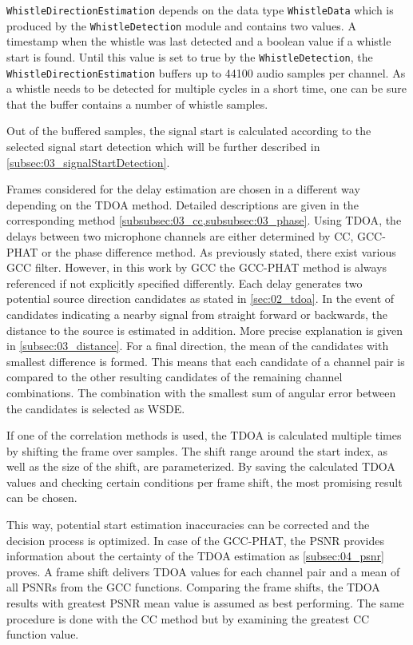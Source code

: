 \lstinline!WhistleDirectionEstimation! depends on the data type \lstinline!WhistleData!
which is produced by the \lstinline!WhistleDetection! module and contains two values.
A timestamp when the whistle was last detected
and a boolean value if a whistle start is found.
Until this value is set to true by the \lstinline!WhistleDetection!, the
\lstinline!WhistleDirectionEstimation! buffers up to
44100 audio samples per channel.
As a whistle needs to be detected for multiple cycles in a short time, one can
be sure that the buffer contains a number of whistle samples.

Out of the buffered samples, the signal start is calculated
according to the selected signal start detection
which will be further described in \cref{subsec:03_signalStartDetection}.

Frames considered for the delay estimation
are chosen in a different way depending on the \ac{TDOA} method.
Detailed descriptions are given in the corresponding method
\cref{subsubsec:03_cc,subsubsec:03_phase}.
Using \ac{TDOA}, the delays between two microphone channels are either
determined by \ac{CC}, \ac{GCC-PHAT} or the phase difference method.
As previously stated, there exist various \ac{GCC} filter.
However, in this work by \ac{GCC} the \ac{GCC-PHAT} method is always referenced
if not explicitly specified differently.
Each delay generates two potential source direction candidates as stated
in \cref{sec:02_tdoa}.
In the event of candidates indicating a nearby signal from straight forward or
backwards, the distance to the source is estimated in addition.
More precise explanation is given in \cref{subsec:03_distance}.
For a final direction, the mean of the candidates with smallest difference
is formed.
This means that each candidate of a channel pair is compared to the other resulting candidates
of the remaining channel combinations.
The combination with the smallest sum of angular error between the candidates is selected as
\acl{WSDE}.

If one of the correlation methods is used, the \ac{TDOA} is calculated
multiple times by shifting the frame over samples.
The shift range around the start index, as well as the size of the shift, are parameterized.
By saving the calculated \ac{TDOA} values and checking certain conditions per frame shift,
the most promising  result can be chosen.

This way, potential start estimation inaccuracies can be corrected and
the decision process is optimized.
In case of the \ac{GCC-PHAT}, the \ac{PSNR} provides information about
the certainty of the \ac{TDOA} estimation as \cref{subsec:04_psnr} proves.
A frame shift delivers \ac{TDOA} values for each channel pair and a
mean of all \acp{PSNR} from the \ac{GCC} functions.
Comparing the frame shifts, the \ac{TDOA} results with
greatest \ac{PSNR} mean value is assumed as best performing.
The same procedure is done with the \ac{CC} method but by examining
the greatest \ac{CC} function value.

